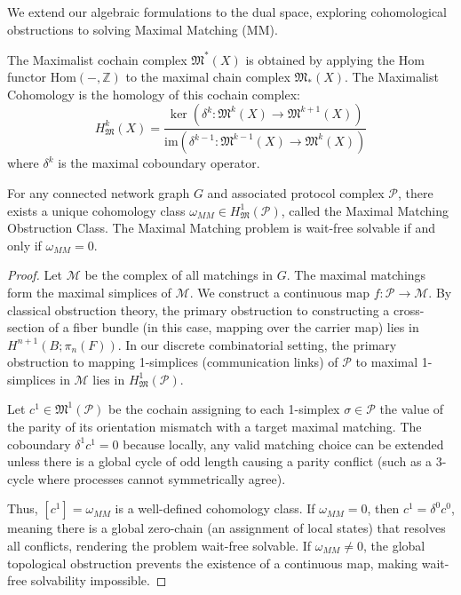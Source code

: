 We extend our algebraic formulations to the dual space, exploring cohomological obstructions to solving Maximal Matching (MM).

\begin{definition}
The Maximalist cochain complex $\mathfrak{M}^*(X)$ is obtained by applying the Hom functor $\text{Hom}(-,\mathbb{Z})$ to the maximal chain complex $\mathfrak{M}_*(X)$. The Maximalist Cohomology is the homology of this cochain complex:
\[
H^k_{\mathfrak{M}}(X) = \frac{\ker(\delta^k: \mathfrak{M}^k(X) \to \mathfrak{M}^{k+1}(X))}{\text{im}(\delta^{k-1}: \mathfrak{M}^{k-1}(X) \to \mathfrak{M}^k(X))}
\]
where $\delta^k$ is the maximal coboundary operator.
\end{definition}

\begin{lemma}
For any connected network graph $G$ and associated protocol complex $\mathcal{P}$, there exists a unique cohomology class $\omega_{MM} \in H^1_{\mathfrak{M}}(\mathcal{P})$, called the Maximal Matching Obstruction Class. The Maximal Matching problem is wait-free solvable if and only if $\omega_{MM} = 0$.
\end{lemma}

\begin{proof}
Let $\mathcal{M}$ be the complex of all matchings in $G$. The maximal matchings form the maximal simplices of $\mathcal{M}$. We construct a continuous map $f: \mathcal{P} \to \mathcal{M}$.
By classical obstruction theory, the primary obstruction to constructing a cross-section of a fiber bundle (in this case, mapping over the carrier map) lies in $H^{n+1}(B; \pi_n(F))$. In our discrete combinatorial setting, the primary obstruction to mapping 1-simplices (communication links) of $\mathcal{P}$ to maximal 1-simplices in $\mathcal{M}$ lies in $H^1_{\mathfrak{M}}(\mathcal{P})$.

Let $c^1 \in \mathfrak{M}^1(\mathcal{P})$ be the cochain assigning to each 1-simplex $\sigma \in \mathcal{P}$ the value of the parity of its orientation mismatch with a target maximal matching. The coboundary $\delta^1 c^1 = 0$ because locally, any valid matching choice can be extended unless there is a global cycle of odd length causing a parity conflict (such as a 3-cycle where processes cannot symmetrically agree).

Thus, $[c^1] = \omega_{MM}$ is a well-defined cohomology class. If $\omega_{MM} = 0$, then $c^1 = \delta^0 c^0$, meaning there is a global zero-chain (an assignment of local states) that resolves all conflicts, rendering the problem wait-free solvable. If $\omega_{MM} \neq 0$, the global topological obstruction prevents the existence of a continuous map, making wait-free solvability impossible.
\end{proof}

